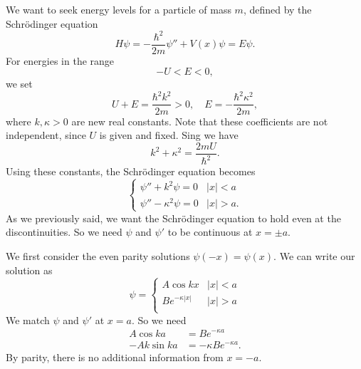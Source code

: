 \documentclass[a4paper]{article}
\begin{document}
We want to seek energy levels for a particle of mass $m$, defined by the Schr\"odinger equation
\[
  H\psi = -\frac{\hbar^2}{2m}\psi'' + V(x) \psi = E\psi.
\]
For energies in the range
\[
  -U < E < 0,
\]
we set
\[
  U + E = \frac{\hbar^2 k^2}{2m} > 0,\quad E = -\frac{\hbar^2 \kappa^2}{2m},
\]
where $k, \kappa > 0$ are new real constants. Note that these coefficients are not independent, since $U$ is given and fixed. Sing we have
\[
  k^2 + \kappa^2 = \frac{2mU}{\hbar^2}.
\]
Using these constants, the Schr\"odinger equation becomes
\[
  \begin{cases}
    \psi'' + k^2 \psi = 0 & |x| < a\\
    \psi'' - \kappa^2 \psi = 0 & |x| > a.
  \end{cases}
\]
As we previously said, we want the Schr\"odinger equation to hold even at the discontinuities. So we need $\psi$ and $\psi'$ to be continuous at $x = \pm a$.

We first consider the even parity solutions $\psi(-x) = \psi(x)$. We can write our solution as
\[
  \psi =
  \begin{cases}
    A \cos kx & |x| < a\\
    B e^{-\kappa |x|} & |x| > a\\
  \end{cases}
\]
We match $\psi$ and $\psi'$ at $x = a$. So we need
\begin{align*}
  A\cos ka &= Be^{-\kappa a}\\
  -Ak\sin ka &= -\kappa Be^{-\kappa a}.
\end{align*}
By parity, there is no additional information from $x = -a$.
\end{document}
